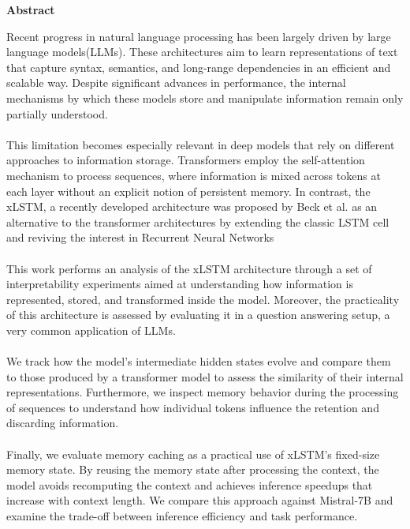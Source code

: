 \begin{center}
{\Large \textbf{Abstract}}
\end{center}
Recent progress in natural language processing has been largely driven by large language models(LLMs).
These architectures aim to learn representations of text that capture syntax, 
semantics, and long-range dependencies in an efficient and scalable way. 
Despite significant advances in performance, the internal mechanisms by which these models store and manipulate information 
remain only partially understood. \\ \\
% 
This limitation becomes especially relevant in deep models that rely on
different approaches to information storage. Transformers employ the self-attention mechanism to 
process sequences, where information is mixed across tokens at each layer without an explicit notion 
of persistent memory. In contrast, the xLSTM, a recently developed architecture was proposed 
by Beck et al. \cite{beck2024xlstmextendedlongshortterm} as an alternative to the transformer architectures 
by extending the classic LSTM cell and reviving the interest in Recurrent Neural Networks \\ \\ 
%
This work performs an analysis of the xLSTM architecture through a set of interpretability 
experiments aimed at understanding how information is represented, stored, and transformed inside the 
model. Moreover, the practicality of this architecture is assessed by evaluating it in a question answering 
setup, a very common application of LLMs. \\ \\ 
%
We track how the model's intermediate hidden states evolve and compare them to those produced by a transformer model
to assess the similarity of their internal representations. 
Furthermore, we inspect memory behavior during the processing of sequences to understand how individual tokens influence 
the retention and discarding information. \\ \\
%
Finally, we evaluate memory caching as a practical use of xLSTM's fixed-size memory state. By reusing the memory 
state after processing the context, the model avoids recomputing the context and achieves inference 
speedups that increase with context length. We compare this approach against Mistral-7B and examine the 
trade-off between inference efficiency and task performance.



